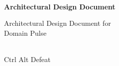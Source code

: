 \begin{titlepage}
    \centering



    \vspace{2cm}
    \hrulefill\\
    \vspace{1cm}
    {\Huge\bfseries Architectural Design Document}

    \vspace{1cm}

    {\Large Architectural Design Document for\\Domain Pulse}\\
    \vspace{1cm}
    \hrulefill\\

    \vfill

    {\large Ctrl Alt Defeat}

    \vspace{1cm}


\end{titlepage}